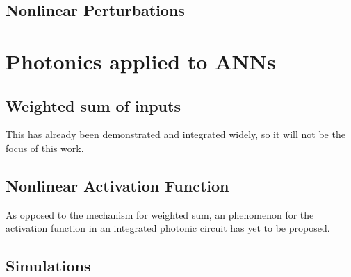 \subsection{Nonlinear Perturbations}
\label{ssec:Nonlinear_Perturbations}


\section{Photonics applied to ANNs}
\label{sec:Photonics_applied_to_ANNs}

\subsection{Weighted sum of inputs}
\label{ssec:Weighted_Sum_of_inputs}
This has already been demonstrated and integrated widely, so it will not be the focus of this work.

\subsection{Nonlinear Activation Function}
\label{ssec:Nonlinear_Activation_Function}
As opposed to the mechanism for weighted sum, an phenomenon for the activation function in an integrated photonic circuit has yet to be proposed.

\subsection{Simulations}
\label{ssec:Simulations}
